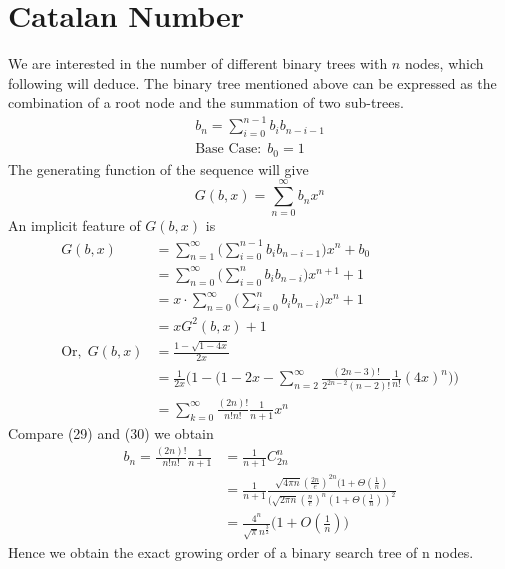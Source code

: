 \documentclass[15pt]{article}
\begin{document}
\section{Catalan Number}
We are interested in the number of different binary trees with $n$ nodes, which following will deduce. The binary tree mentioned above can be expressed as the combination of a root node and the summation of two sub-trees.
\begin{equation}
\begin{aligned}
    b_n = \sum_{i=0}^{n-1}b_ib_{n-i-1} \\
    \text{Base Case:}~~b_0 = 1
\end{aligned}
\end{equation}
The generating function of the sequence will give
\begin{equation}
    G(b, x) = \sum_{n=0}^{\infty} b_nx^n
\end{equation}
An implicit feature of $G(b,x)$ is
\begin{equation}
\begin{aligned}
    G(b,x) &= \sum_{n=1}^{\infty}\bigg(\sum_{i=0}^{n-1}b_ib_{n-i-1}\bigg)x^n + b_0\\
    &=  \sum_{n=0}^{\infty} \bigg( \sum_{i=0}^n b_ib_{n-i} \bigg) x^{n+1} + 1 \\
    &= x \cdot \sum_{n=0}^{\infty} \bigg( \sum_{i=0}^n b_ib_{n-i} \bigg) x^{n} + 1 \\
    &= xG^2(b,x) + 1 \\
    \text{Or,}~~G(b,x) &= \frac{1-\sqrt{1-4x}}{2x} \\
    &= \frac{1}{2x} \bigg(1-\big(1-2x-\sum_{n=2}^{\infty} \frac{(2n-3)!}{2^{2n-2}(n-2)!}\frac{1}{n!}(4x)^n \big)\bigg)  \\
    &= \sum_{k=0}^{\infty} \frac{(2n)!}{n!n!}\frac{1}{n+1}x^n
\end{aligned}
\end{equation}
Compare (29) and (30) we obtain
\begin{equation}
\begin{aligned}
    b_n = \frac{(2n)!}{n!n!}\frac{1}{n+1} &= \frac{1}{n+1} C_{2n}^{n} \\
    &= \frac{1}{n+1}\frac{\sqrt{4\pi n}(\frac{2n}{e})^{2n}(1+\Theta(\frac{1}{n})}{(\sqrt{2\pi n}(\frac{n}{e})^n(1+\Theta(\frac{1}{n}))^2}\\
    &= \frac{4^n}{\sqrt{\pi} n^{\frac{3}{2}}}\bigg(1+O(\frac{1}{n})\bigg)
\end{aligned}
\end{equation}
Hence we obtain the exact growing order of a binary search tree of n nodes.
\end{document}
